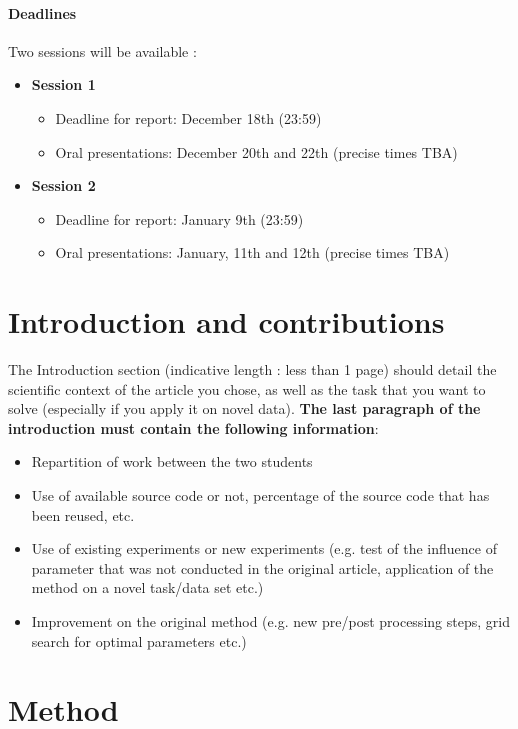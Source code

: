 \documentclass[11pt]{article}
\begin{document}
\paragraph{Deadlines}
Two sessions will be available :
\begin{itemize}
    \item \textbf{Session 1}
          \begin{itemize}
              \item Deadline for report: December 18th (23:59)
              \item Oral presentations: December 20th and 22th (precise times TBA)
          \end{itemize}
    \item \textbf{Session 2}
          \begin{itemize}
              \item Deadline for report: January 9th (23:59)
              \item Oral presentations: January, 11th and 12th (precise times TBA)
          \end{itemize}
\end{itemize}

\section{Introduction and contributions}

The Introduction section (indicative length : less than 1 page) should detail the scientific context of the article you chose, as well as the task that you want to solve (especially if you apply it on novel data). \textbf{The last paragraph of the introduction must contain the following information}:
\begin{itemize}
    \item Repartition of work between the two students
    \item Use of available source code or not, percentage of the source code that has been reused, etc.
    \item Use of existing experiments or new experiments (e.g. test of the influence of parameter that was not conducted in the original article, application of the method on a novel task/data set etc.)
    \item Improvement on the original method (e.g. new pre/post processing steps, grid search for optimal parameters etc.)
\end{itemize}

\section{Method}
\end{document}
